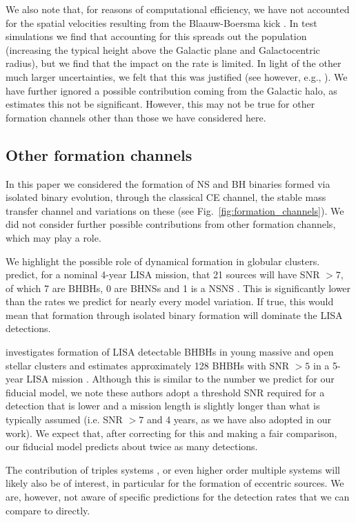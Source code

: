 We also note that, for reasons of computational efficiency, we have not accounted for the spatial velocities resulting from the Blaauw-Boersma kick \citep{Blaauw+1961,Boersma1961}. In test simulations we find that accounting for this spreads out the population (increasing the typical height above the Galactic plane and Galactocentric radius), but we find that the impact on the rate is limited. In light of the other much larger uncertainties, we felt that this was justified (see however, e.g., \citealt{Brandt+1995, Abbott+2017_GW170817_progenitor}). We have further ignored a possible contribution coming from the Galactic halo, as \citet{Lamberts+2018} estimates this not be significant. However, this may not be true for other formation channels other than those we have considered here.

\subsection{Other formation channels}\label{sec:other_formation_channels}

In this paper we considered the formation of NS and BH binaries formed via isolated binary evolution, through the classical CE channel, the stable mass transfer channel and variations on these (see Fig.~\ref{fig:formation_channels}). We did not consider further possible contributions from other formation channels, which may play a role.

We highlight the possible role of dynamical formation in globular clusters. \citet{Kremer+2018} predict, for a nominal 4-year LISA mission, that 21 sources will have SNR $> 7$, of which 7 are BHBHs, 0 are BHNSs and 1 is a NSNS \citep[see Table~1][]{Kremer+2018}. This is significantly lower than the rates we predict for nearly every model variation. If true, this would mean that formation through isolated binary formation will dominate the LISA detections. 

\citet{Banerjee+2020} investigates formation of LISA detectable BHBHs in young massive and open stellar clusters and estimates approximately 128 BHBHs with SNR $>5$ in a 5-year LISA mission \citep[see Table~1, Column 9][]{Banerjee+2020}. Although this is similar to the number we predict for our fiducial model, we note these authors adopt a threshold SNR required for a detection that is lower and a mission length is slightly longer than what is typically assumed (i.e. SNR $>7$ and 4 years, as we have also adopted in our work). We expect that, after correcting for this and making a fair comparison, our fiducial model predicts about twice as many detections.

The contribution of triples systems \citep[e.g.][]{Antonini+2017}, or even higher order multiple systems \citep[e.g.][]{Vynatheya+2021} will likely also be of interest, in particular for the formation of eccentric sources. We are, however, not aware of specific predictions for the detection rates that we can compare to directly.

